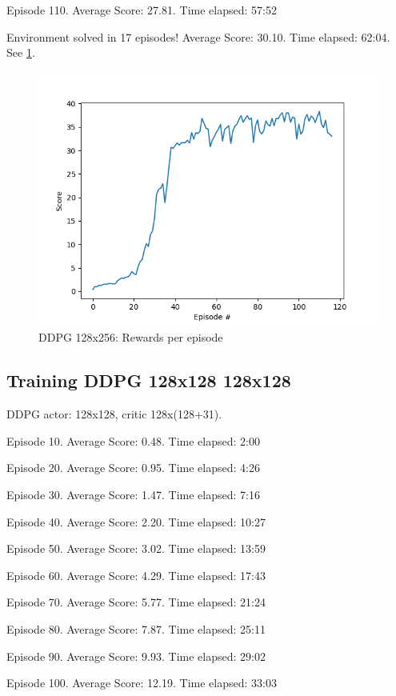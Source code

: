 \documentclass{report}
\begin{document}
Episode 110.	Average Score: 27.81.	Time elapsed: 57:52

Environment solved in 17 episodes!	Average Score: 30.10.	Time elapsed: 62:04. See \ref{fig:DDPG_128x256}.

\begin{figure}
	\includegraphics[width=0.9\linewidth]{res/ddpg_128x256/score.png}
	\caption{DDPG 128x256: Rewards per episode}
	\label{fig:DDPG_128x256}
\end{figure}


\subsection*{Training DDPG 128x128 128x128}

DDPG actor: 128x128, critic 128x(128+31).

Episode 10.	Average Score: 0.48.	Time elapsed: 2:00

Episode 20.	Average Score: 0.95.	Time elapsed: 4:26

Episode 30.	Average Score: 1.47.	Time elapsed: 7:16

Episode 40.	Average Score: 2.20.	Time elapsed: 10:27

Episode 50.	Average Score: 3.02.	Time elapsed: 13:59

Episode 60.	Average Score: 4.29.	Time elapsed: 17:43

Episode 70.	Average Score: 5.77.	Time elapsed: 21:24

Episode 80.	Average Score: 7.87.	Time elapsed: 25:11

Episode 90.	Average Score: 9.93.	Time elapsed: 29:02

Episode 100.	Average Score: 12.19.	Time elapsed: 33:03
\end{document}

